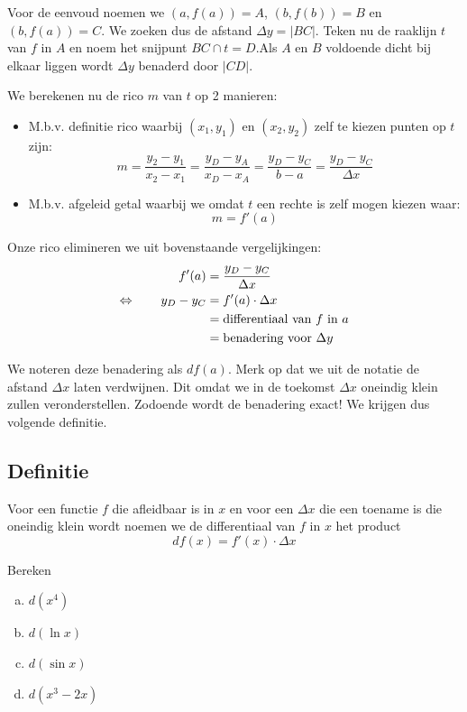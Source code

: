 \documentclass[a4paper,12pt]{article}
\begin{document}
Voor de eenvoud noemen we $(a,f(a))=A$, $(b,f(b))=B$ en $(b,f(a))=C$. We zoeken dus de afstand $\Delta y=|BC|$. Teken nu de raaklijn $t$ van $f$ in $A$ en noem het snijpunt $BC \cap t=D$.Als $A$ en $B$ voldoende dicht bij elkaar liggen wordt $\Delta y$ benaderd door $|CD|$.

We berekenen nu de rico $m$ van $t$ op 2 manieren:
\begin{itemize}
  \item M.b.v. definitie rico waarbij $(x_1,y_1)$ en $(x_2, y_2)$ zelf te kiezen punten op $t$ zijn:
  $$m=\dfrac{y_2-y_1}{x_2-x_1}=\dfrac{y_D-y_A}{x_D-x_A}=\dfrac{y_D-y_C}{b-a}=\dfrac{y_D-y_C}{\Delta x}$$
  \item M.b.v. afgeleid getal waarbij we omdat $t$ een rechte is zelf mogen kiezen waar:
  $$m = f'(a)$$
\end{itemize}

Onze rico elimineren we uit bovenstaande vergelijkingen:
\begin{align*}
     f'(a)     &= \dfrac{y_D-y_C}{\Delta x}\\
\Leftrightarrow \qquad y_D - y_C &= f'(a)\cdot \Delta x\\
                      &= \mbox{differentiaal van $f$ in $a$}\\
                      &= \mbox{benadering voor $\Delta y$}\\
\end{align*}

We noteren deze benadering als $df(a)$. Merk op dat we uit de notatie de afstand $\Delta x$ laten verdwijnen. Dit omdat we in de toekomst $\Delta x$ oneindig klein zullen veronderstellen. Zodoende wordt de benadering exact! We krijgen dus volgende definitie.

\subsection{Definitie}
Voor een functie $f$ die afleidbaar is in $x$ en voor een $\Delta x$ die een toename is die oneindig klein wordt noemen we de differentiaal van $f$ in $x$ het product
$$df(x)=f'(x)\cdot\Delta x$$

\begin{oefening}
Bereken
\begin{multicols}{2}
\begin{enumerate}[(a)]
  \itemsep1em
  \item $\displaystyle d(x^4)$
  \item $\displaystyle d(\ln x)$
  \item $\displaystyle d(\sin x)$
  \item $\displaystyle d(x^3-2x)$
\end{enumerate}
\end{multicols}
\end{oefening}
\end{document}
